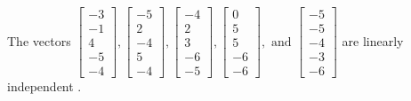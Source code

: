 \begin{exercise}
\begin{exerciseStatement}
  \end{exerciseStatement}
  \begin{exerciseAnswer}
   The vectors \(\left[\begin{array}{r}
-3 \\
-1 \\
4 \\
-5 \\
-4
\end{array}\right] , \left[\begin{array}{r}
-5 \\
2 \\
-4 \\
5 \\
-4
\end{array}\right] , \left[\begin{array}{r}
-4 \\
2 \\
3 \\
-6 \\
-5
\end{array}\right] , \left[\begin{array}{r}
0 \\
5 \\
5 \\
-6 \\
-6
\end{array}\right] , \text{ and } \left[\begin{array}{r}
-5 \\
-5 \\
-4 \\
-3 \\
-6
\end{array}\right]\) are 
  	 linearly independent  .
  


  \end{exerciseAnswer}
\end{exercise}